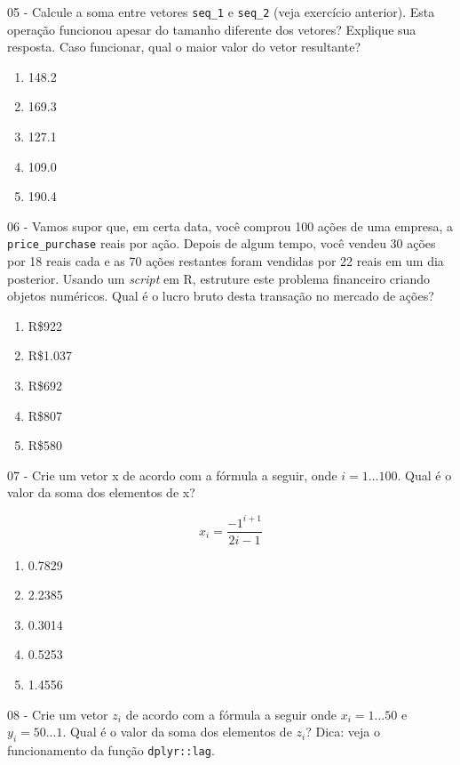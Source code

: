 \documentclass[
  11pt,
]{book}
\providecommand{\tightlist}{%
  \setlength{\itemsep}{0pt}\setlength{\parskip}{0pt}}
\begin{document}
05 -
Calcule a soma entre vetores \texttt{seq\_1} e \texttt{seq\_2} (veja exercício anterior). Esta operação funcionou apesar do tamanho diferente dos vetores? Explique sua resposta. Caso funcionar, qual o maior valor do vetor resultante?

\begin{enumerate}
\def\labelenumi{\alph{enumi})}
\tightlist
\item
  148.2
\item
  169.3
\item
  127.1
\item
  109.0
\item
  190.4
\end{enumerate}

06 -
Vamos supor que, em certa data, você comprou 100 ações de uma empresa, a \texttt{price\_purchase} reais por ação. Depois de algum tempo, você vendeu 30 ações por 18 reais cada e as 70 ações restantes foram vendidas por 22 reais em um dia posterior. Usando um \emph{script} em R, estruture este problema financeiro criando objetos numéricos. Qual é o lucro bruto desta transação no mercado de ações?

\begin{enumerate}
\def\labelenumi{\alph{enumi})}
\tightlist
\item
  R\$922
\item
  R\$1.037
\item
  R\$692
\item
  R\$807
\item
  R\$580
\end{enumerate}

07 -
Crie um vetor x de acordo com a fórmula a seguir, onde \(i=1...100\). Qual é o valor da soma dos elementos de x?

\[
x_i=\frac{-1^{i+1}}{2i-1}
\]

\begin{enumerate}
\def\labelenumi{\alph{enumi})}
\tightlist
\item
  0.7829
\item
  2.2385
\item
  0.3014
\item
  0.5253
\item
  1.4556
\end{enumerate}

08 -
Crie um vetor \(z_i\) de acordo com a fórmula a seguir onde \(x_i=1...50\) e \(y_i=50...1\). Qual é o valor da soma dos elementos de \(z_i\)? Dica: veja o funcionamento da função \texttt{dplyr::lag}.
\end{document}
